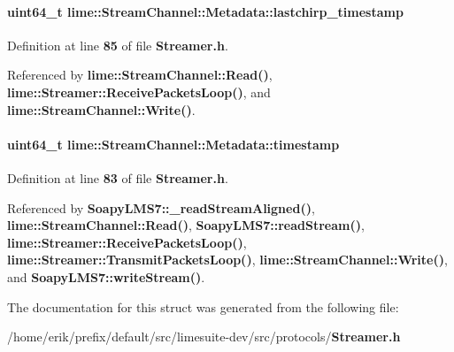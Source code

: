 \paragraph[{lastchirp\+\_\+timestamp}]{\setlength{\rightskip}{0pt plus 5cm}uint64\+\_\+t lime\+::\+Stream\+Channel\+::\+Metadata\+::lastchirp\+\_\+timestamp}\label{structlime_1_1StreamChannel_1_1Metadata_a7ad5b6c4e371b9c0878e853d1b5cca2f}


Definition at line {\bf 85} of file {\bf Streamer.\+h}.



Referenced by {\bf lime\+::\+Stream\+Channel\+::\+Read()}, {\bf lime\+::\+Streamer\+::\+Receive\+Packets\+Loop()}, and {\bf lime\+::\+Stream\+Channel\+::\+Write()}.

\paragraph[{timestamp}]{\setlength{\rightskip}{0pt plus 5cm}uint64\+\_\+t lime\+::\+Stream\+Channel\+::\+Metadata\+::timestamp}\label{structlime_1_1StreamChannel_1_1Metadata_add4c7efdc0015eb028fcb439029f1348}


Definition at line {\bf 83} of file {\bf Streamer.\+h}.



Referenced by {\bf Soapy\+L\+M\+S7\+::\+\_\+read\+Stream\+Aligned()}, {\bf lime\+::\+Stream\+Channel\+::\+Read()}, {\bf Soapy\+L\+M\+S7\+::read\+Stream()}, {\bf lime\+::\+Streamer\+::\+Receive\+Packets\+Loop()}, {\bf lime\+::\+Streamer\+::\+Transmit\+Packets\+Loop()}, {\bf lime\+::\+Stream\+Channel\+::\+Write()}, and {\bf Soapy\+L\+M\+S7\+::write\+Stream()}.



The documentation for this struct was generated from the following file\+:\begin{DoxyCompactItemize}
\item 
/home/erik/prefix/default/src/limesuite-\/dev/src/protocols/{\bf Streamer.\+h}\end{DoxyCompactItemize}
